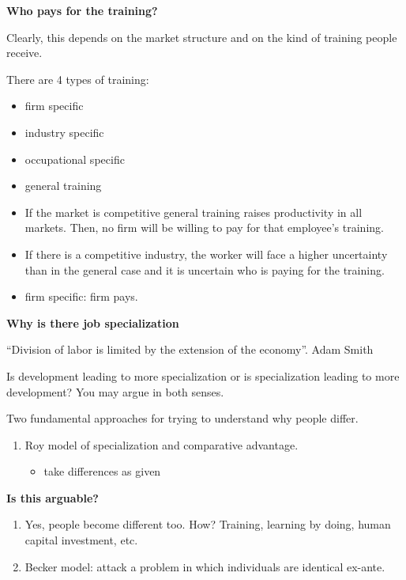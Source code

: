 \documentclass[14pt,notitlepage]{article}
\begin{document}
\textbf{Who pays for the training?}

Clearly, this depends on the market structure and on the kind of training people receive.

There are 4 types of training:
\begin{itemize}
\item firm specific
\item industry specific
\item occupational specific
\item general training
\end{itemize}

\begin{itemize}
\item If the market is competitive general training raises productivity in all markets. Then, no firm will be willing to pay for that employee's training.
\item If there is a competitive industry, the worker will face a higher uncertainty than in the general case and it is uncertain who is paying for the training.
\item firm specific: firm pays.
\end{itemize}

\textbf{Why is there job specialization}

``Division of labor is limited by the extension of the economy''. Adam Smith

Is development leading to more specialization or is specialization leading to more development? You may argue in both senses.

Two fundamental approaches for trying to understand why people differ.

\begin{enumerate}[1.]
\item Roy model of specialization and comparative advantage.
    \begin{itemize}
    \item take differences as given
    \end{itemize}
\end{enumerate}

\textbf{Is this arguable?}

\begin{enumerate}[1.]
\item Yes, people become different too. How? Training, learning by doing, human capital investment, etc.
\item Becker model: attack a problem in which individuals are identical ex-ante.
\end{enumerate}
\end{document}
